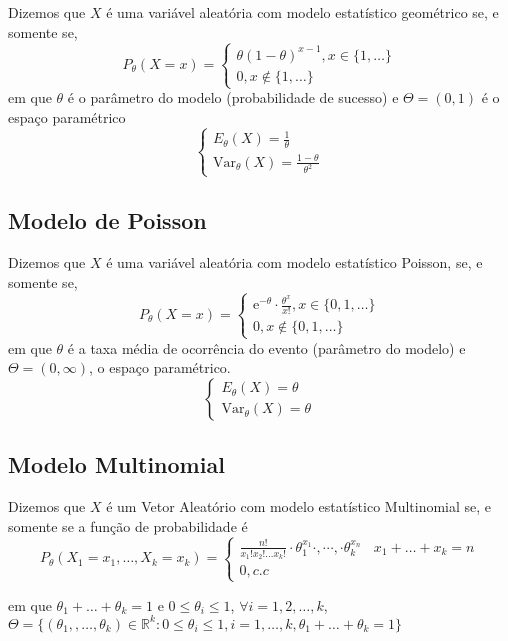 \documentclass[
  letterpaper,
  DIV=11,
  numbers=noendperiod]{scrreprt}
\begin{document}
Dizemos que \(X\) é uma variável aleatória com modelo estatístico
geométrico se, e somente se, \[P_\theta(X=x)=\begin{cases}
\theta (1-\theta)^{x-1}, x \in \{1,\dots\} \\
0, x \not \in \{1,\dots\}
\end{cases}
\] em que \(\theta\) é o parâmetro do modelo (probabilidade de sucesso)
e \(\Theta=(0,1)\) é o espaço paramétrico \[
\begin{cases}
E_\theta(X)=\frac{1}{\theta}\\
\mathrm{Var}_\theta(X) = \frac{1-\theta}{\theta^{2}}
\end{cases}
\]

\subsection{Modelo de Poisson}\label{modelo-de-poisson}

Dizemos que \(X\) é uma variável aleatória com modelo estatístico
Poisson, se, e somente se, \[
P_\theta(X=x)=\begin{cases}
\mathrm{e}^{-\theta}\cdot \frac{\theta^{x}}{x!}, x \in \{0,1,\dots\} \\
0, x \not \in \{0,1,\dots\}
\end{cases}
\] em que \(\theta\) é a taxa média de ocorrência do evento (parâmetro
do modelo) e \(\Theta = (0, \infty)\), o espaço paramétrico. \[
\begin{cases}
E_\theta(X)=\theta\\
\mathrm{Var}_\theta(X) = \theta
\end{cases}
\]

\subsection{Modelo Multinomial}\label{modelo-multinomial}

Dizemos que \(X\) é um Vetor Aleatório com modelo estatístico
Multinomial se, e somente se a função de probabilidade é \[
P_{\theta}(X_{1}=x_{1},\dots,X_{k} = x_{k})=\begin{cases}
\frac{n!}{x_{1}!x_{2}!\dots x_{k}!} \cdot \theta^{x_{1}}_{1} \cdot,\cdots, \cdot\theta^{x_n}_{k} ~~~~ x_{1}+\dots+x_{k}=n\\
0, c.c
\end{cases}
\]

em que \(\theta_{1}+\dots+\theta_{k}=1\) e \(0\leq \theta_{i} \leq 1\),
\(\forall i = 1,2,\dots,k\),
\(\Theta=\{(\theta_{1},,\dots,\theta_{k}) \in \mathbb{R}^{k} : 0\leq \theta_{i} \leq 1, i=1,\dots,k,
\theta_{1}+\dots+\theta_{k} = 1 \}\)
\end{document}
